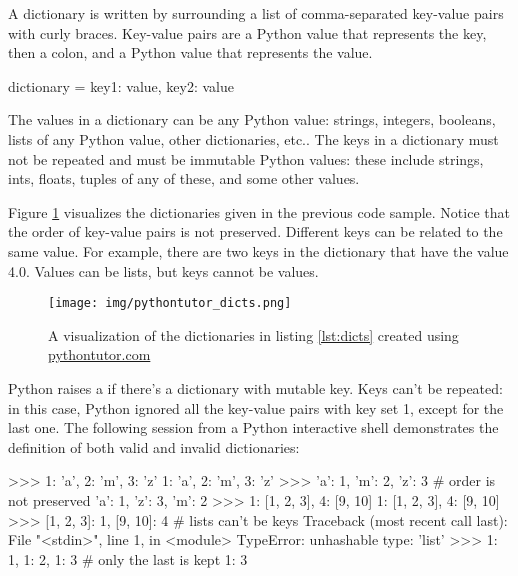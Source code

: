 \documentclass[11pt]{cselabheader}
\begin{document}
\begin{multicols}{2}
A dictionary is written by surrounding a list of comma-separated
key-value pairs with curly braces.  Key-value
pairs are a Python value that represents the key, then a colon, and a
Python value that represents the value.

\begin{python3code}
dictionary = {key1: value, key2: value}
\end{python3code}

The values in a dictionary can be any Python value: strings, integers,
booleans, lists of any Python value, other dictionaries, etc..
The keys in a dictionary must not be repeated and must be immutable Python values:
these include strings, ints, floats, tuples of any of these, and some other values.

Figure \ref{fig:dicts} visualizes the dictionaries given in the previous code
sample. Notice that the order of key-value pairs is not preserved.
Different keys can be related to the same value.
For example, there are two keys in the 
dictionary that have the value 4.0.
Values can be lists, but keys cannot be values.

\newcolumn
\begin{figure}[H]
\begin{center}
    \texttt{[image: img/pythontutor\_dicts.png]}
    \caption{A visualization of the dictionaries in listing \ref{lst:dicts}
created using \url{pythontutor.com}}\label{fig:dicts}
\end{center}
\end{figure}
\end{multicols}

Python raises a  if there's a dictionary with
mutable key.  Keys can't be repeated: in this case, Python ignored all the key-value
pairs with key set 1, except for the last one.
The following session from a Python interactive shell
demonstrates the definition of both valid and invalid dictionaries:

\begin{pyconcode}
>>> {1: 'a', 2: 'm', 3: 'z'}
{1: 'a', 2: 'm', 3: 'z'}
>>> {'a': 1, 'm': 2, 'z': 3}  # order is not preserved
{'a': 1, 'z': 3, 'm': 2}
>>> {1: [1, 2, 3], 4: [9, 10]}
{1: [1, 2, 3], 4: [9, 10]}
>>> {[1, 2, 3]: 1, [9, 10]: 4}  # lists can't be keys
Traceback (most recent call last):
  File "<stdin>", line 1, in <module>
TypeError: unhashable type: 'list'
>>> {1: 1, 1: 2, 1: 3}  # only the last is kept
{1: 3}

\end{pyconcode}
\end{document}
